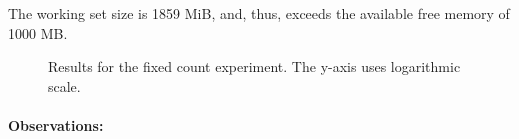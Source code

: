 \documentclass[a4paper,10pt]{article}
\begin{document}
The working set size is 1859 MiB, and, thus, exceeds the available free memory of 1000 MB.


\begin{figure}
\centering
\caption{Results for the fixed count experiment. The y-axis uses logarithmic scale. \label{fig:fixed-count}}
\end{figure}

\paragraph{Observations:}
\end{document}
